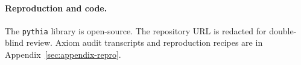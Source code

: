 \paragraph{Reproduction and code.}
The \texttt{pythia} library is open-source. The repository URL
is redacted for double-blind review. Axiom audit transcripts
and reproduction recipes are in
Appendix~\ref{sec:appendix-repro}.
